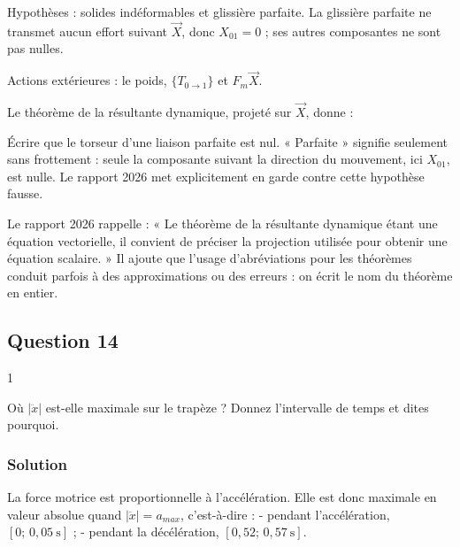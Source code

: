 \documentclass[11pt,a4paper]{article}
\newcommand{\equationajustee}[1]{%
  \sbox{\boiteequation}{$\displaystyle #1$}%
  \ifdim\wd\boiteequation>\linewidth
    \[\resizebox{\linewidth}{!}{\usebox{\boiteequation}}\]%
  \else
    \[#1\]%
  \fi}
\begin{document}
Hypothèses : solides indéformables et glissière parfaite. La glissière parfaite ne transmet aucun effort suivant \(\vec X\), donc \(X_{01} = 0\) ; ses autres composantes ne sont pas nulles.

Actions extérieures : le poids, \(\{T_{0\to1}\}\) et \(F_m\vec X\).

Le théorème de la résultante dynamique, projeté sur \(\vec X\), donne :

\equationajustee{\boxed{F_m(t) = (m_1+m_2)\,\ddot x(t)}}

\begin{piege}

Écrire que le torseur d'une liaison parfaite est nul. « Parfaite » signifie seulement sans frottement : seule la composante suivant la direction du mouvement, ici \(X_{01}\), est nulle. Le rapport 2026 met explicitement en garde contre cette hypothèse fausse.

\end{piege}

\begin{jury}

Le rapport 2026 rappelle : « Le théorème de la résultante dynamique étant une équation vectorielle, il convient de préciser la projection utilisée pour obtenir une équation scalaire. » Il ajoute que l'usage d'abréviations pour les théorèmes conduit parfois à des approximations ou des erreurs : on écrit le nom du théorème en entier.

\end{jury}

\hypertarget{question-14}{%
\subsection{Question 14}\label{question-14}}

\begin{indication}{1}

Où \(|\ddot x|\) est-elle maximale sur le trapèze ? Donnez l'intervalle de temps et dites pourquoi.

\end{indication}

\hypertarget{solution-13}{%
\subsubsection{Solution}\label{solution-13}}

La force motrice est proportionnelle à l'accélération. Elle est donc maximale en valeur absolue quand \(|\ddot x| = a_{max}\), c'est-à-dire :
- pendant l'accélération, \([0;\,0{,}05\ \text{s}]\) ;
- pendant la décélération, \([0{,}52;\,0{,}57\ \text{s}]\).
\end{document}
